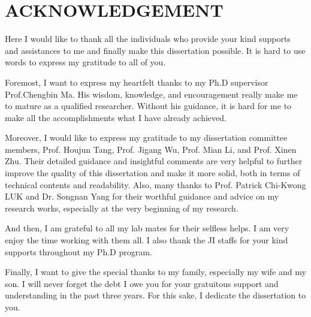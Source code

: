 \chapter*{ACKNOWLEDGEMENT}

Here I would like to thank all the individuals who provide your kind supports and assistances to me and finally make this dissertation possible. It is hard to use words to express my gratitude to all of you.

Foremost, I want to express my heartfelt thanks to my Ph.D supervisor Prof.Chengbin Ma. His wisdom, knowledge, and encouragement really make me to mature as a qualified researcher.
Without his guidance, it is hard for me to make all the accomplishments what I have already achieved. 

Moreover, I would like to express my gratitude to my dissertation committee members, Prof. Houjun Tang, Prof. Jigang Wu, Prof. Mian Li, and Prof. Xinen Zhu. Their detailed guidance and insightful comments are very helpful to further improve the quality of this dissertation and make it more solid, both in terms of technical contents and readability. Also, many thanks to Prof. Patrick Chi-Kwong LUK and Dr. Songnan Yang for their worthful guidance and advice on my research works, especially at the very beginning of my research.

And then, I am grateful to all my lab mates for their selfless helps. I am very enjoy the time working with them all. I also thank the JI staffs for your kind supports throughout my Ph.D program.

Finally, I want to give the special thanks to my family, especially my wife and my son. I will never forget the debt I owe you for your gratuitous support and understanding in the past three years. For this sake, I dedicate the dissertation to you.




